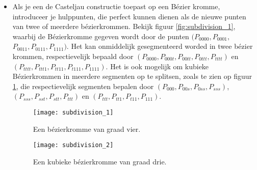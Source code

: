 \begin{itemize}
		{
			\begin{itemize} 
				\item Als je een de Casteljau constructie toepast op een Bézier kromme, introduceer je hulppunten, die perfect kunnen dienen als de nieuwe punten van twee of meerdere bézierkrommen. Bekijk figuur \ref{fig:subdivision_1}, waarbij de Bézierkromme gegeven wordt door de punten $(P_{0000}, P_{0001},$ $P_{0011}, P_{0111}, P_{1111})$. Het kan onmiddelijk gesegmenteerd worded in twee bézier krommen, respectievelijk bepaald door $(P_{0000},P_{000t},P_{00tt},P_{0ttt},P_{tttt})$ en $(P_{tttt},P_{ttt1},P_{tt11},P_{t111},P_{1111})$. Het is ook mogelijk om kubieke Bézierkrommen in meerdere segmenten op te splitsen, zoals te zien op figuur \ref{fig:subdivision_2}, die respectievelijk segmenten bepalen door $(P_{000}, P_{00s}, P_{0ss}, P_{sss})$, $(P_{sss}, P_{sst}, P_{stt}, P_{ttt})$ en $(P_{ttt}, P_{tt1}, P_{t11}, P_{111})$. 
				\begin{figure}[ht]
					\begin{minipage}{0.5\textwidth}
						\centering
						\texttt{[image: subdivision\_1]}
						\caption{Een bézierkromme van graad vier.}
						\label{fig:subdivision_1}
					\end{minipage}
					\begin{minipage}{0.5\textwidth}
						\centering
						\texttt{[image: subdivision\_2]}
						\caption{Een kubieke bézierkromme van graad drie.}
						\label{fig:subdivision_2}
					\end{minipage}

				\end{figure}
			

\end{itemize}}
\end{itemize}
